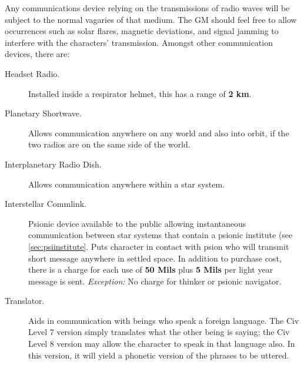 Any communications device relying on the transmissions of radio waves
will be subject to the normal vagaries of that medium. The GM should
feel free to allow occurrences such as solar flares, magnetic
deviations, and signal jamming to interfere with the characters'
transmission. Amongst other communication devices, there are:

\begin{description}
\item[Headset Radio.] Installed inside a respirator helmet, this has a
  range of \textbf{2 km}.
\item[Planetary Shortwave.] Allows communication anywhere on any world
  and also into orbit, if the two radios are on the same side of the
  world.
\item[Interplanetary Radio Dish.] Allows communication anywhere within
  a star system.
\item[\hypertarget{tag:commlink}{Interstellar Commlink}.] Psionic
  device available to the public 
  allowing instantaneous communication between star systems that
  contain a psionic institute (see \ref{sec:psiinstitute}.  Puts
  character in contact with psion who will transmit short message
  anywhere in settled space.  In addition to purchase cost, there is a
  charge for each use of \textbf{50 Mils} plus \textbf{5 Mils} per
  light year message is sent.  \emph{Exception:} No charge for thinker or
  psionic navigator.
\item[\hypertarget{tag:translator}{Translator}.] Aids in communication
  with beings who speak a 
  foreign language. The Civ Level 7 version simply translates what the
  other being is saying; the Civ Level 8 version may allow the
  character to speak in that language also. In this version, it will
  yield a phonetic version of the phrases to be uttered.
\end{description}

